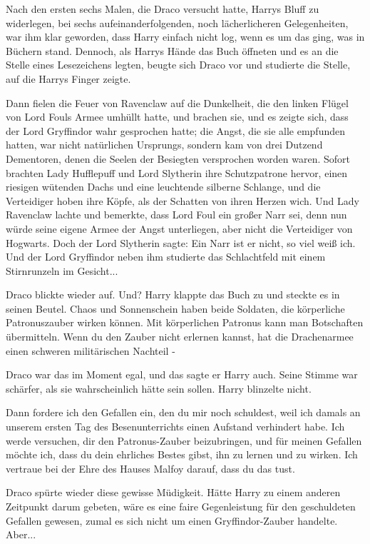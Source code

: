 Nach den ersten sechs Malen, die Draco versucht hatte, Harrys Bluff zu
widerlegen, bei sechs aufeinanderfolgenden, noch lächerlicheren Gelegenheiten,
war ihm klar geworden, dass Harry einfach nicht log, wenn es um das ging, was in
Büchern stand. Dennoch, als Harrys Hände das Buch öffneten und es an die Stelle
eines Lesezeichens legten, beugte sich Draco vor und studierte die Stelle, auf
die Harrys Finger zeigte.

Dann fielen die Feuer von Ravenclaw auf die Dunkelheit, die den linken Flügel
von Lord Fouls Armee umhüllt hatte, und brachen sie, und es zeigte sich, dass
der Lord Gryffindor wahr gesprochen hatte; die Angst, die sie alle empfunden
hatten, war nicht natürlichen Ursprungs, sondern kam von drei Dutzend
Dementoren, denen die Seelen der Besiegten versprochen worden waren. Sofort
brachten Lady Hufflepuff und Lord Slytherin ihre Schutzpatrone hervor, einen
riesigen wütenden Dachs und eine leuchtende silberne Schlange, und die
Verteidiger hoben ihre Köpfe, als der Schatten von ihren Herzen wich. Und Lady
Ravenclaw lachte und bemerkte, dass Lord Foul ein großer Narr sei, denn nun
würde seine eigene Armee der Angst unterliegen, aber nicht die Verteidiger von
Hogwarts. Doch der Lord Slytherin sagte: \glqq{}Ein Narr ist er nicht, so viel
weiß ich.\grqq{} Und der Lord Gryffindor neben ihm studierte das Schlachtfeld
mit einem Stirnrunzeln im Gesicht...

Draco blickte wieder auf. \glqq{}Und?\grqq{} Harry klappte das Buch zu und
steckte es in seinen Beutel. \glqq{}Chaos und Sonnenschein haben beide Soldaten,
die körperliche Patronuszauber wirken können. Mit körperlichen Patronus kann man
Botschaften übermitteln. Wenn du den Zauber nicht erlernen kannst, hat die
Drachenarmee einen schweren militärischen Nachteil -\grqq{}

Draco war das im Moment egal, und das sagte er Harry auch. Seine Stimme war
schärfer, als sie wahrscheinlich hätte sein sollen. Harry blinzelte nicht.

\glqq{}Dann fordere ich den Gefallen ein, den du mir noch schuldest, weil ich
damals an unserem ersten Tag des Besenunterrichts einen Aufstand verhindert
habe. Ich werde versuchen, dir den Patronus-Zauber beizubringen, und für meinen
Gefallen möchte ich, dass du dein ehrliches Bestes gibst, ihn zu lernen und zu
wirken. Ich vertraue bei der Ehre des Hauses Malfoy darauf, dass du das
tust.\grqq{}

Draco spürte wieder diese gewisse Müdigkeit. Hätte Harry zu einem anderen
Zeitpunkt darum gebeten, wäre es eine faire Gegenleistung für den geschuldeten
Gefallen gewesen, zumal es sich nicht um einen Gryffindor-Zauber handelte.
Aber...

